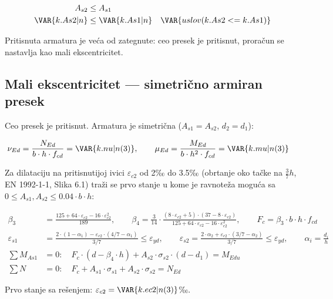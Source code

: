 \begin{align*}
A_{s2} &\leq A_{s1} \\
\VAR{k.As2|n} &\leq \VAR{k.As1|n} \quad \VAR{uslov(k.As2 <= k.As1)}
\end{align*}

Pritisnuta armatura je veća od zategnute: ceo presek je pritisnut, proračun se nastavlja kao mali ekscentricitet.

\subsection{Mali ekscentricitet --- simetrično armiran presek}

Ceo presek je pritisnut. Armatura je simetrična ($A_{s1} = A_{s2}$, $d_2 = d_1$):

\begin{align*}
\nu_{Ed} &= \frac{N_{Ed}}{b \cdot h \cdot f_{cd}} = \VAR{k.nu|n(3)}, \qquad \mu_{Ed} = \frac{M_{Ed}}{b \cdot h^2 \cdot f_{cd}} = \VAR{k.mu|n(3)}
\end{align*}

Za dilataciju na pritisnutijoj ivici $\varepsilon_{c2}$ od 2‰ do 3.5‰ (obrtanje oko tačke na $\tfrac{3}{7} h$, EN 1992-1-1, Slika 6.1) traži se prvo stanje u kome je ravnoteža moguća sa $0 \leq A_{s1}, A_{s2} \leq 0.04 \cdot b \cdot h$:

\begin{align*}
\beta_3 &= \frac{125 + 64 \cdot \varepsilon_{c2} - 16 \cdot \varepsilon_{c2}^2}{189}, \qquad \beta_4 = \frac{3}{14} \cdot \frac{(8 \cdot \varepsilon_{c2} + 5) \cdot (37 - 8 \cdot \varepsilon_{c2})}{125 + 64 \cdot \varepsilon_{c2} - 16 \cdot \varepsilon_{c2}^2}, \qquad F_c = \beta_3 \cdot b \cdot h \cdot f_{cd} \\
\varepsilon_{s1} &= \frac{2 \cdot (1 - \alpha_1) - \varepsilon_{c2} \cdot (4/7 - \alpha_1)}{3/7} \leq \varepsilon_{yd}, \qquad \varepsilon_{s2} = \frac{2 \cdot \alpha_2 + \varepsilon_{c2} \cdot (3/7 - \alpha_2)}{3/7} \leq \varepsilon_{yd}, \qquad \alpha_i = \frac{d_i}{h} \\
\sum M_{As1} &= 0: \quad F_c \cdot (d - \beta_4 \cdot h) + A_{s2} \cdot \sigma_{s2} \cdot (d - d_1) = M_{Edu} \\
\sum N &= 0: \quad F_c + A_{s1} \cdot \sigma_{s1} + A_{s2} \cdot \sigma_{s2} = N_{Ed}
\end{align*}

Prvo stanje sa rešenjem: $\varepsilon_{c2} = \VAR{k.ec2|n(3)}$‰.


